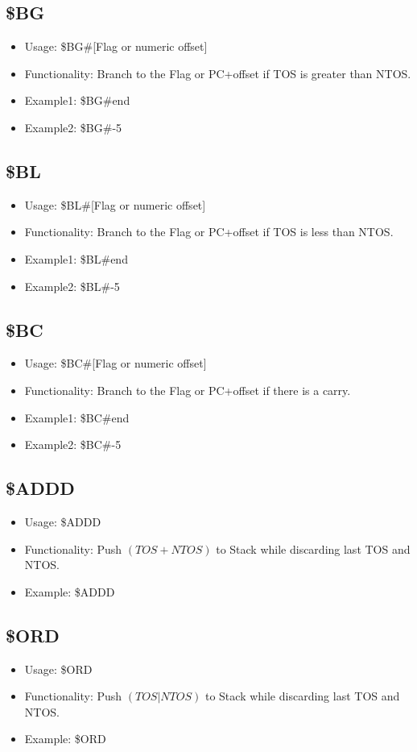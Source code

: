 \documentclass[11pt]{report}
\begin{document}
    \subsection{\$BG}
    \begin{itemize}
        \item Usage: \$BG\#[Flag or numeric offset]
        \item Functionality: Branch to the Flag or PC+offset if TOS is greater than NTOS.
        \item Example1: \$BG\#end
        \item Example2: \$BG\#-5
    \end{itemize}
    \subsection{\$BL}
    \begin{itemize}
        \item Usage: \$BL\#[Flag or numeric offset]
        \item Functionality: Branch to the Flag or PC+offset if TOS is less than NTOS.
        \item Example1: \$BL\#end
        \item Example2: \$BL\#-5
    \end{itemize}
    \subsection{\$BC}
    \begin{itemize}
        \item Usage: \$BC\#[Flag or numeric offset]
        \item Functionality: Branch to the Flag or PC+offset if there is a carry.
        \item Example1: \$BC\#end
        \item Example2: \$BC\#-5
    \end{itemize}
    \subsection{\$ADDD}
    \begin{itemize}
        \item Usage: \$ADDD
        \item Functionality: Push $(TOS + NTOS)$ to Stack while discarding last TOS and NTOS.
        \item Example: \$ADDD
    \end{itemize}
    \subsection{\$ORD}
    \begin{itemize}
        \item Usage: \$ORD
        \item Functionality: Push $(TOS | NTOS)$ to Stack while discarding last TOS and NTOS.
        \item Example: \$ORD
    \end{itemize}
\end{document}
